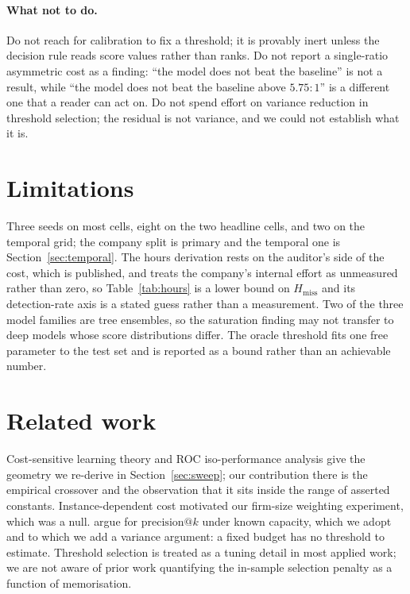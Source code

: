 \documentclass[11pt]{article}
\begin{document}
\paragraph{What not to do.} Do not reach for calibration to fix a threshold; it is provably inert
unless the decision rule reads score values rather than ranks. Do not report a single-ratio
asymmetric cost as a finding: ``the model does not beat the baseline'' is not a result, while
``the model does not beat the baseline above $5.75{:}1$'' is a different one that a reader can act
on. Do not spend effort on variance reduction in threshold selection; the residual is not
variance, and we could not establish what it is.

\section{Limitations}

Three seeds on most cells, eight on the two headline cells, and two on the temporal grid; the company split is primary and the temporal one is
Section~\ref{sec:temporal}. The hours derivation rests on the auditor's side of the
cost, which is published, and treats the company's internal effort as unmeasured rather than
zero, so Table~\ref{tab:hours} is a lower bound on $H_\text{miss}$ and its detection-rate axis is
a stated guess rather than a measurement. Two of the three model families are tree ensembles, so
the saturation finding may not transfer to deep models whose score distributions differ. The
oracle threshold fits one free parameter to the test set and is reported as a bound rather than
an achievable number.

\section{Related work}

Cost-sensitive learning theory \citep{elkan2001} and ROC iso-performance analysis
\citep{provost2001} give the geometry we re-derive in Section~\ref{sec:sweep}; our contribution
there is the empirical crossover and the observation that it sits inside the range of asserted
constants. Instance-dependent cost \citep{bahnsen2014} motivated our firm-size weighting
experiment, which was a null. \citet{consequentialist2025} argue for $\mathrm{precision}@k$ under
known capacity, which we adopt and to which we add a variance argument: a fixed budget has no
threshold to estimate. Threshold selection is treated as a tuning detail in most applied work; we
are not aware of prior work quantifying the in-sample selection penalty as a function of
memorisation.
\end{document}
